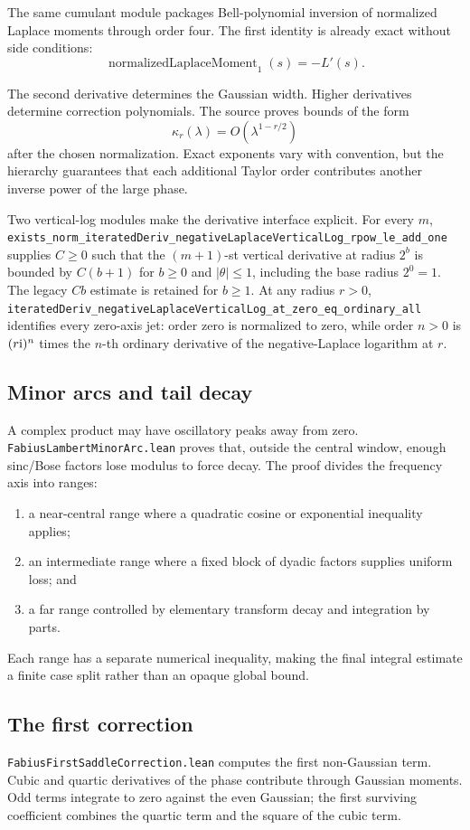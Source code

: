 \documentclass[11pt,oneside]{article}
\theoremstyle{definition}
\theoremstyle{remark}
\begin{document}
The same cumulant module packages Bell-polynomial inversion of normalized
Laplace moments through order four.  The first identity is already exact
without side conditions:
\[
 \operatorname{normalizedLaplaceMoment}_1(s)=-L'(s).
\]

The second derivative determines the Gaussian width.  Higher derivatives determine correction polynomials.  The source proves bounds of the form
\[
  \kappa_r(\lambda)=O(\lambda^{1-r/2})
\]
after the chosen normalization.  Exact exponents vary with convention, but the hierarchy guarantees that each additional Taylor order contributes another inverse power of the large phase.

Two vertical-log modules make the derivative interface explicit.  For every
\(m\), \nolinkurl{exists_norm_iteratedDeriv_negativeLaplaceVerticalLog_rpow_le_add_one}
supplies \(C\geq0\) such that the \((m+1)\)-st vertical derivative at radius
\(2^b\) is bounded by \(C(b+1)\) for \(b\geq0\) and \(|\theta|\leq1\), including
the base radius \(2^0=1\).  The legacy \(Cb\) estimate is retained for
\(b\geq1\).  At any radius \(r>0\),
\nolinkurl{iteratedDeriv_negativeLaplaceVerticalLog_at_zero_eq_ordinary_all}
identifies every zero-axis jet: order zero is normalized to zero, while order
\(n>0\) is \((r\mathrm{i})^n\) times the \(n\)-th ordinary derivative of the
negative-Laplace logarithm at \(r\).

\subsection{Minor arcs and tail decay}
A complex product may have oscillatory peaks away from zero.  \nolinkurl{FabiusLambertMinorArc.lean} proves that, outside the central window, enough sinc/Bose factors lose modulus to force decay.  The proof divides the frequency axis into ranges:
\begin{enumerate}
  \item a near-central range where a quadratic cosine or exponential inequality applies;
  \item an intermediate range where a fixed block of dyadic factors supplies uniform loss; and
  \item a far range controlled by elementary transform decay and integration by parts.
\end{enumerate}
Each range has a separate numerical inequality, making the final integral estimate a finite case split rather than an opaque global bound.

\subsection{The first correction}
\nolinkurl{FabiusFirstSaddleCorrection.lean} computes the first non-Gaussian term.  Cubic and quartic derivatives of the phase contribute through Gaussian moments.  Odd terms integrate to zero against the even Gaussian; the first surviving coefficient combines the quartic term and the square of the cubic term.
\end{document}
